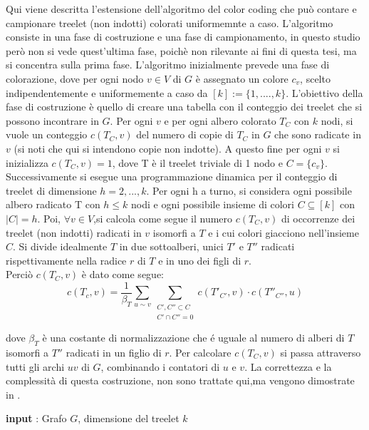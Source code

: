 Qui viene descritta l'estensione dell'algoritmo del color coding che pu\`o contare e campionare treelet (non indotti) colorati uniformemnte a caso.
L'algoritmo consiste in una fase di costruzione e una fase di campionamento, in questo studio per\`o non si vede quest'ultima fase, poich\`e non rilevante ai fini di questa tesi, ma si concentra sulla prima fase.
L'algoritmo inizialmente prevede una fase di colorazione, dove per ogni nodo $ v \in V $ di $ G $ \`e assegnato un colore $ c_v $, scelto indipendentemente e uniformemente a caso da $ [k] := \{1,....,k\} $.
L'obiettivo della fase di costruzione \`e quello di creare una tabella con il conteggio dei treelet che si possono incontrare in $ G $.
Per ogni $ v $ e per ogni albero colorato $ T_C $ con $ k $ nodi, si vuole un conteggio $ c(T_C , v) $ del numero di copie di $ T_C $  in $ G $ che sono radicate in $ v $ (si noti che qui si intendono copie non indotte).
A questo fine per ogni $ v $ si inizializza $ c(T_C , v) = 1 $, dove T \`e il treelet triviale di 1 nodo e $ C = \{c_v\} $.
Successivamente si esegue una programmazione dinamica per il conteggio di treelet di dimensione $ h = 2,...,k $.
Per ogni h a turno, si considera ogni possibile albero radicato T con $ h \le k $ nodi e ogni possibile insieme di colori $ C \subseteq [k] $ con $ |C| = h $.
Poi, $ \forall v \in V $,si calcola come segue il numero $ c(T_C,v) $ di occorrenze dei treelet (non indotti) radicati in $ v $ isomorfi a $ T $ e i cui colori giacciono nell'insieme $ C $. Si divide idealmente $ T $ in due sottoalberi, unici $ T' $ e $ T'' $  radicati rispettivamente nella radice $ r $ di $ T $ e in uno dei figli di $ r $.\\
Perci\`o $ c(T_C,v) $ \`e dato come segue:
\begin{equation}\label{conta}
	c(T_c,v)=\frac{1}{\beta_T}\sum_{u\sim v}\sum_{\substack{{C',C''\subset C}\\{C'\cap C'' =0}}}c(T'_{C'},v)\cdot c(T''_{C''},u)
\end{equation}

dove $ \beta_T $ \`e una costante di normalizzazione che \'e uguale al numero di alberi di $ T $ isomorfi a $ T'' $ radicati in un figlio di $ r $. Per calcolare $ c(T_C,v) $ si passa attraverso tutti gli archi $ uv $ di $ G $, combinando i contatori di $ u $ e $ v $. La correttezza e la complessit\`a di questa costruzione, non sono trattate qui,ma vengono dimostrate in \cite{alon1995color}.

\begin{algorithm}[H]
	\SetAlgoLined
	\caption{Fase di costruzione}
 	\textbf{input} : Grafo $ G $, dimensione del treelet $ k $ \;	
 			
\end{algorithm}

